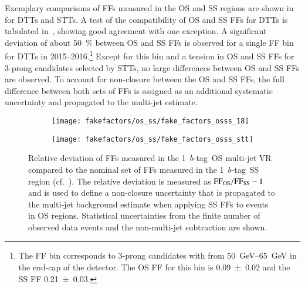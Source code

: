 Exemplary comparisons of FFs measured in the OS and SS regions are shown
in~ for DTTs and STTs. A test of the compatibility of
OS and SS FFs for DTTs is tabulated in~,
showing good agreement with one exception. A significant deviation of about
\SI{50}{\percent} between OS and SS FFs is observed for a single FF bin for DTTs
in 2015--2016.\footnote{The FF bin corresponds to 3-prong \tauhadvis candidates
  with \pT from \SIrange{50}{65}{\GeV} in the end-cap of the detector. The OS FF
  for this bin is \num{0.09 +- 0.02} and the SS FF \num{0.21 +- 0.03}.} Except
for this bin and a tension in OS and SS FFs for 3-prong \tauhadvis candidates
selected by STTs, no large differences between OS and SS FFs are observed.
To account for non-closure between the OS and SS FFs, the full difference
between both sets of FFs is assigned as an additional systematic uncertainty and
propagated to the multi-jet estimate.

\begin{figure}[htbp]
  \centering

  \begin{subfigure}[t]{0.48\textwidth}
    \texttt{[image: fakefactors/os\_ss/fake\_factors\_osss\_18]}
    \label{fig:fake_factor_OSSS_dtt}
  \end{subfigure}\hfill%
  \begin{subfigure}[t]{0.48\textwidth}
    \texttt{[image: fakefactors/os\_ss/fake\_factors\_osss\_stt]}
    \label{fig:fake_factor_OSSS_stt}
  \end{subfigure}

  \caption[Comparison of OS and SS FFs in the \hadhad channel.]{Relative
    deviation of FFs measured in the 1~$b$-tag~OS multi-jet VR compared to the
    nominal set of FFs measured in the 1~$b$-tag~SS region
    (cf.~). The relative
    deviation is measured as $\text{FF}_\text{OS} / \text{FF}_\text{SS} - 1$ and is used to
    define a non-closure uncertainty that is propagated to the multi-jet
    background estimate when applying SS FFs to events in OS
    regions. Statistical uncertainties from the finite number of observed data
    events and the non-multi-jet subtraction are shown.}%
  \label{fig:fake_factor_OSSS}
\end{figure}

